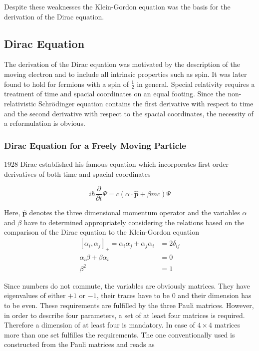 Despite these weaknesses the Klein-Gordon equation was the basis for the
derivation of the Dirac equation.


\subsection{Dirac Equation}
The derivation of the Dirac equation was motivated by the description of the
moving electron and to include all intrinsic properties such as spin.
It was later found to hold for fermions with a spin of $\frac12$ in general.
Special relativity requires a treatment of time and spacial coordinates on an
equal footing. Since the non-relativistic Schrödinger equation contains the first
derivative with respect to time and the second derivative with respect to the spacial
coordinates, the necessity of a reformulation is obvious.


\subsubsection{Dirac Equation for a Freely Moving Particle}\label{freep}
1928 Dirac established his famous equation which incorporates first order
derivatives of both time and spacial coordinates \cite{Dirac28_1}

\begin{equation}\label{diracg}
i\hbar \frac\partial{\partial t} \Psi = c (\alpha\cdot\hat{\mathbf{p}}+\beta mc) \Psi
\end{equation}

Here, $\hat{\mathbf{p}}$ denotes the three dimensional momentum operator and
the variables $\alpha$ and $\beta$ have to determined appropriately considering
the relations based on the comparison of the Dirac equation to the Klein-Gordon
equation
\begin{align}
\left[\alpha_i,\alpha_j\right]_+ = \alpha_i\alpha_j + \alpha_j\alpha_i
                                &= 2\delta_{ij}\\
  \alpha_i\beta + \beta\alpha_i &= 0 \\
  \beta^2                       &= 1
\end{align}

Since numbers do not commute, the variables are obviously matrices.
They have eigenvalues of either $+1$ or $-1$, their traces have to be 0
and their dimension has to be even. These requirements are fulfilled by the
three Pauli matrices. However, in order to describe four parameters, a set of
at least four matrices is required. Therefore a dimension of at least four is
mandatory. In case of $4\times 4$ matrices more than one set fulfilles the
requirements. The one conventionally used is constructed from the Pauli matrices
and reads as

